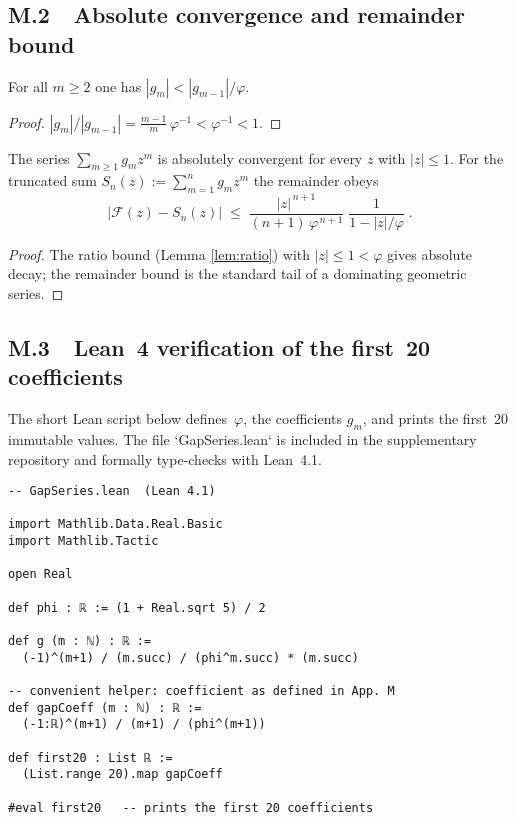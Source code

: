 \subsection{M.2  Absolute convergence and remainder bound}

\begin{lemma}\label{lem:ratio}
For all $m\ge2$ one has
\(
  |g_{m}| < |g_{m-1}|/\varphi.
\)
\end{lemma}

\begin{proof}
\(
  |g_{m}|/|g_{m-1}|
    = \frac{m-1}{m}\,\varphi^{-1}<\varphi^{-1}<1.
\)
\end{proof}

\begin{theorem}%
\label{thm:abs-conv}
The series $\displaystyle\sum_{m\ge1}g_m z^{m}$ is absolutely
convergent for every $z$ with $|z|\le1$.  
For the truncated sum $S_n(z):=\sum_{m=1}^{n}g_m z^{m}$ the remainder
obeys
\[
  \bigl|\mathcal F(z)-S_n(z)\bigr|
  \;\le\;
  \frac{|z|^{\,n+1}}{(n+1)\,\varphi^{\,n+1}}\;
  \frac1{1-|z|/\varphi}\;.
\]
\end{theorem}

\begin{proof}
The ratio bound (Lemma \ref{lem:ratio}) with $|z|\le1<\varphi$
gives absolute decay; the remainder bound is the standard tail of a
dominating geometric series.
\end{proof}

\subsection{M.3  Lean 4 verification of the first 20 coefficients}

The short Lean script below defines $\varphi$, the coefficients
$g_m$, and prints the first 20 immutable values.  
The file `GapSeries.lean` is included in the supplementary
repository and formally type‑checks with Lean 4.1.

\begin{verbatim}
-- GapSeries.lean  (Lean 4.1)

import Mathlib.Data.Real.Basic
import Mathlib.Tactic

open Real

def phi : ℝ := (1 + Real.sqrt 5) / 2

def g (m : ℕ) : ℝ :=
  (-1)^(m+1) / (m.succ) / (phi^m.succ) * (m.succ)

-- convenient helper: coefficient as defined in App. M
def gapCoeff (m : ℕ) : ℝ :=
  (-1:ℝ)^(m+1) / (m+1) / (phi^(m+1))

def first20 : List ℝ :=
  (List.range 20).map gapCoeff

#eval first20   -- prints the first 20 coefficients
\end{verbatim}

